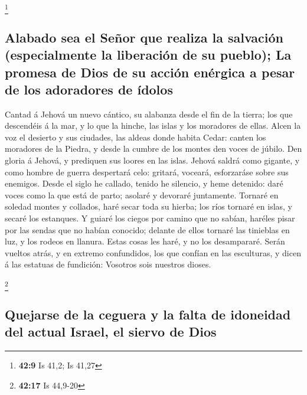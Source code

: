 \footnote{\textbf{42:9} Is 41,2; Is 41,27}

\hypertarget{alabado-sea-el-seuxf1or-que-realiza-la-salvaciuxf3n-especialmente-la-liberaciuxf3n-de-su-pueblo-la-promesa-de-dios-de-su-acciuxf3n-enuxe9rgica-a-pesar-de-los-adoradores-de-uxeddolos}{%
\subsection{Alabado sea el Señor que realiza la salvación (especialmente
la liberación de su pueblo); La promesa de Dios de su acción enérgica a
pesar de los adoradores de
ídolos}\label{alabado-sea-el-seuxf1or-que-realiza-la-salvaciuxf3n-especialmente-la-liberaciuxf3n-de-su-pueblo-la-promesa-de-dios-de-su-acciuxf3n-enuxe9rgica-a-pesar-de-los-adoradores-de-uxeddolos}}

 Cantad á Jehová un nuevo cántico, su alabanza desde el
fin de la tierra; los que descendéis á la mar, y lo que la hinche, las
islas y los moradores de ellas.  Alcen la voz el desierto
y sus ciudades, las aldeas donde habita Cedar: canten los moradores de
la Piedra, y desde la cumbre de los montes den voces de júbilo.
 Den gloria á Jehová, y prediquen sus loores en las
islas.  Jehová saldrá como gigante, y como hombre de
guerra despertará celo: gritará, voceará, esforzaráse sobre sus
enemigos.  Desde el siglo he callado, tenido he silencio,
y heme detenido: daré voces como la que está de parto; asolaré y
devoraré juntamente.  Tornaré en soledad montes y
collados, haré secar toda su hierba; los ríos tornaré en islas, y secaré
los estanques.  Y guiaré los ciegos por camino que no
sabían, haréles pisar por las sendas que no habían conocido; delante de
ellos tornaré las tinieblas en luz, y los rodeos en llanura. Estas cosas
les haré, y no los desampararé.  Serán vueltos atrás, y
en extremo confundidos, los que confían en las esculturas, y dicen á las
estatuas de fundición: Vosotros sois nuestros dioses.

\footnote{\textbf{42:17} Is 44,9-20}

\hypertarget{quejarse-de-la-ceguera-y-la-falta-de-idoneidad-del-actual-israel-el-siervo-de-dios}{%
\subsection{Quejarse de la ceguera y la falta de idoneidad del actual
Israel, el siervo de
Dios}\label{quejarse-de-la-ceguera-y-la-falta-de-idoneidad-del-actual-israel-el-siervo-de-dios}}

